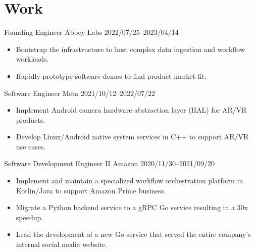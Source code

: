 \section{Work}

\begin{experiencelist}
   \experienceitem
        {Founding Engineer}
        {Abbey Labs}
        {2022/07/25--2023/04/14}
    \begin{itemize}[noitemsep, topsep=0pt]
        \item
            Bootstrap the infrastructure to host complex data ingestion and workflow workloads.
        \item
            Rapidly prototype software demos to find product market fit.
    \end{itemize}

    \experienceitem
        {Software Engineer}
        {Meta}
        {2021/10/12--2022/07/22}
    \begin{itemize}[noitemsep, topsep=0pt]
        \item
            Implement Android camera hardware abstraction layer (HAL) for AR/VR products.
        \item
            Develop Linux/Android native system services in C++ to support
            AR/VR use cases.
    \end{itemize}

    \experienceitem
        {Software Development Engineer II}
        {Amazon}
        {2020/11/30--2021/09/20}
    \begin{itemize}[noitemsep, topsep=0pt]
        \item
            Implement and maintain a specialized workflow orchestration
            platform in Kotlin/Java to support Amazon Prime business.
    \end{itemize}

    \begin{itemize}[noitemsep, topsep=0pt]
        \item
            Migrate a Python backend service to a gRPC Go service resulting in
            a 30x speedup.
        \item
            Lead the development of a new Go service that served the entire
            company's internal social media website.
    \end{itemize}
\end{experiencelist}
